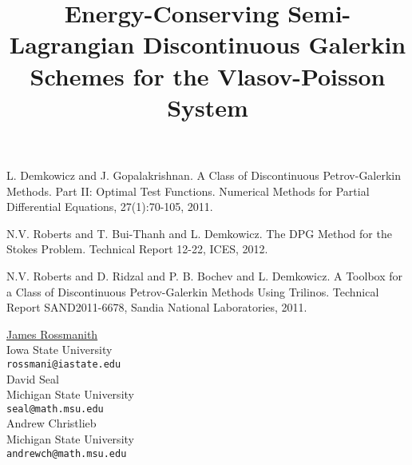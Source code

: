\documentclass[article,A4,11pt]{llncs}%
\begin{document}

\begin{thebibliography}{10}
{\sc L. Demkowicz and J. Gopalakrishnan}. {A Class of Discontinuous Petrov-Galerkin Methods. Part II: Optimal Test Functions}. Numerical Methods for Partial Differential Equations, 27(1):70-105, 2011.

{\sc N.V. Roberts and T. Bui-Thanh and L. Demkowicz}. {The DPG Method for the Stokes Problem}. Technical Report 12-22, ICES, 2012.

{\sc N.V. Roberts and D. Ridzal and P. B. Bochev and L. Demkowicz}. {A Toolbox for a Class of Discontinuous Petrov-Galerkin Methods Using Trilinos}. Technical Report SAND2011-6678, Sandia National Laboratories, 2011.
\end{thebibliography}

\title{Energy-Conserving Semi-Lagrangian Discontinuous Galerkin Schemes for the Vlasov-Poisson System}
 \author{} \institute{}
\maketitle
\begin{center}
{\large \underline{James Rossmanith}}\\
Iowa State University\\
{\tt rossmani@iastate.edu}
\\ \vspace{4mm}
{\large David Seal}\\
Michigan State University\\
{\tt seal@math.msu.edu}
\\ \vspace{4mm}
{\large Andrew Christlieb}\\
Michigan State University\\
{\tt andrewch@math.msu.edu}
\end{center}
\end{document}
